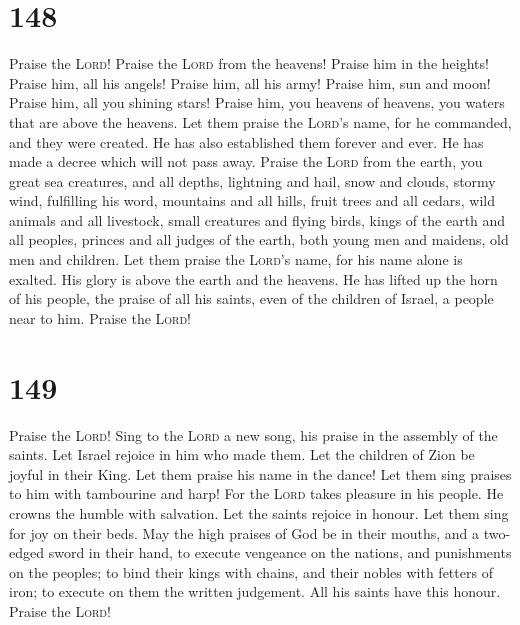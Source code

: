 \hypertarget{section-147}{%
\section{148}\label{section-147}}

 Praise the \textsc{Lord}! Praise the \textsc{Lord} from
the heavens! Praise him in the heights!  Praise him, all
his angels! Praise him, all his army!  Praise him, sun and
moon! Praise him, all you shining stars!  Praise him, you
heavens of heavens, you waters that are above the heavens.
 Let them praise the \textsc{Lord}'s name, for he
commanded, and they were created.  He has also established
them forever and ever. He has made a decree which will not pass away.
 Praise the \textsc{Lord} from the earth, you great sea
creatures, and all depths,  lightning and hail, snow and
clouds, stormy wind, fulfilling his word,  mountains and
all hills, fruit trees and all cedars,  wild animals and
all livestock, small creatures and flying birds,  kings
of the earth and all peoples, princes and all judges of the earth,
 both young men and maidens, old men and children.
 Let them praise the \textsc{Lord}'s name, for his name
alone is exalted. His glory is above the earth and the heavens.
 He has lifted up the horn of his people, the praise of
all his saints, even of the children of Israel, a people near to him.
Praise the \textsc{Lord}!

\hypertarget{section-148}{%
\section{149}\label{section-148}}

 Praise the \textsc{Lord}! Sing to the \textsc{Lord} a new
song, his praise in the assembly of the saints.  Let
Israel rejoice in him who made them. Let the children of Zion be joyful
in their King.  Let them praise his name in the dance! Let
them sing praises to him with tambourine and harp!  For
the \textsc{Lord} takes pleasure in his people. He crowns the humble
with salvation.  Let the saints rejoice in honour. Let
them sing for joy on their beds.  May the high praises of
God be in their mouths, and a two-edged sword in their hand,
 to execute vengeance on the nations, and punishments on
the peoples;  to bind their kings with chains, and their
nobles with fetters of iron;  to execute on them the
written judgement. All his saints have this honour. Praise the
\textsc{Lord}!

